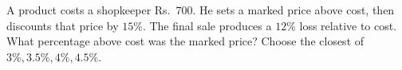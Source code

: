 A product costs a shopkeeper Rs.\ $700$. He sets a marked price above cost, then discounts that price by $15\%$. The final sale produces a $12\%$ loss relative to cost. What percentage above cost was the marked price? Choose the closest of $3\%,3.5\%,4\%,4.5\%$.
